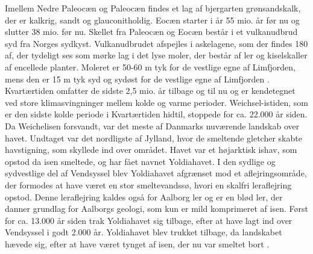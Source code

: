 \newline \indent{     }  Imellem Nedre Paleocæn og Paleocæn findes et lag af bjergarten grønsandskalk, der er kalkrig, sandt og glauconitholdig.
\newline \indent{     }  Eocæn starter i år 55 mio. år før nu og slutter 38 mio. før nu. Skellet fra Paleocæn og Eocæn består i et vulkanudbrud syd fra Norges sydkyst. Vulkanudbrudet afspejles i askelagene, som der findes 180 af, der tydeligt ses som mørke lag i det lyse moler, der består af ler og kiselskaller af encellede planter. Moleret er 50-60 m tyk for de vestlige egne af Limfjorden, mens den er 15 m tyk syd og sydøst for de vestlige egne af Limfjorden \citep{geopdf}.
\newline
\newline
Kvartærtiden omfatter de sidste 2,5 mio. år tilbage og til nu og er kendetegnet ved store klimasvingninger mellem kolde og varme perioder. Weichsel-istiden, som er den sidste kolde periode i Kvartærtiden hidtil, stoppede for ca. 22.000 år siden. Da Weichelisen forsvandt, var det meste af Danmarks nuværende landskab over havet. Undtaget var det nordligste af Jylland, hvor de smeltende gletcher skabte havstigning, som skyllede ind over området. Havet var et højarktisk ishav, som opstod da isen smeltede, og har fået navnet Yoldiahavet. I den sydlige og sydvestlige del af Vendsyssel blev Yoldiahavet afgrænset mod et aflejringsområde, der formodes at have været en stor smeltevandssø, hvori en skalfri leraflejring opstod. Denne leraflejring kaldes også for Aalborg ler og er en blød ler, der danner grundlag for Aalborgs geologi, som kun er mild komprimeret af isen. Først for ca. 13.000 år siden trak Yoldiahavet sig tilbage, efter at have lagt ind over Vendsyssel i godt 2.000 år. Yoldiahavet blev trukket tilbage, da landskabet hævede sig, efter at have været tynget af isen, der nu var smeltet bort \citep{geopdf}.